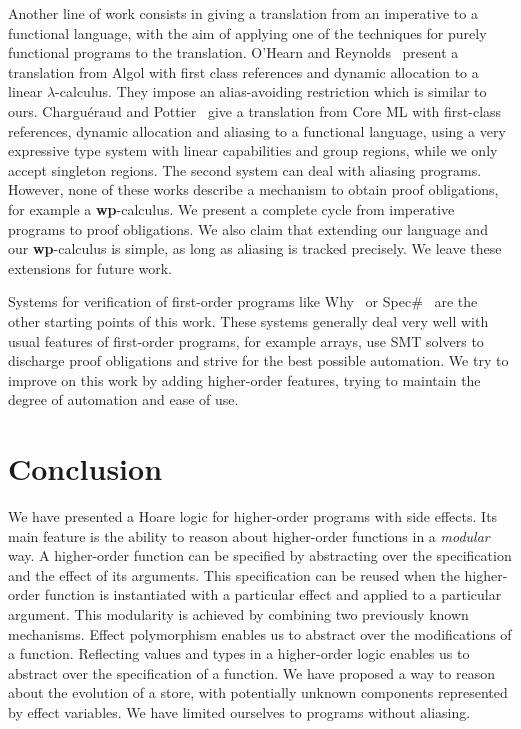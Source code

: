 \documentclass[a4paper]{llncs}
\newcommand{\wpre}{{\bf wp}}
\begin{document}
Another line of work consists in giving a translation from an imperative to a
functional language, with the aim of applying one of the techniques for purely
functional programs to the translation. O'Hearn and
Reynolds~\cite{ohearn-reynolds-00} present a translation from Algol with first
class references and dynamic allocation to a linear $\lambda$-calculus. They
impose an alias-avoiding restriction which is similar to ours. Charguéraud and
Pottier~\cite{chargueraud-pottier-08} give a translation from Core ML with
first-class references, dynamic allocation and aliasing to a functional
language, using a very expressive type system with linear capabilities and
group regions, while we only accept singleton regions. The second system can
deal with aliasing programs. However, none of these works describe a mechanism
to obtain proof obligations, for example a \wpre-calculus.  We present a
complete cycle from imperative programs to proof obligations. We also claim
that extending our language and our \wpre-calculus is simple, as long as
aliasing is tracked precisely.  We leave these extensions for future work.

Systems for verification of first-order programs like
Why~\cite{Filliatre00a} or Spec\#~\cite{BarnettLS04} are the other
starting points of this work. These systems generally deal very well
with usual features of first-order programs, for example arrays, use
SMT solvers to discharge proof obligations and strive for the best
possible automation. We try to improve on this work by adding
higher-order features, trying to maintain the degree of automation and
ease of use.

\section{Conclusion}
\label{sec:conclusion}

We have presented a Hoare logic for higher-order programs with side
effects. Its main feature is the ability to reason about higher-order
functions in a {\em modular} way. A higher-order function can be
specified by abstracting over the specification and the effect of its
arguments. This specification can be reused when the higher-order
function is instantiated with a particular effect and applied to a
particular argument. This modularity is achieved by combining two
previously known mechanisms. Effect polymorphism enables us to
abstract over the modifications of a function. Reflecting values and
types in a higher-order logic enables us to abstract over the
specification of a function. We have proposed a way to
reason about the evolution of a store, with potentially unknown
components represented by effect variables. We have limited ourselves to
programs without aliasing.
\end{document}
